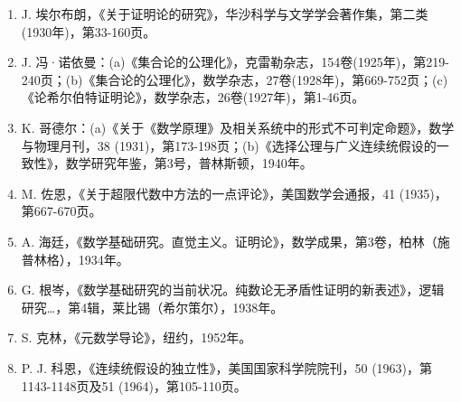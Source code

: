 \begin{enumerate}
\item
  J. 埃尔布朗，《关于证明论的研究》，华沙科学与文学学会著作集，第二类(1930年)，第33-160页。
\item
  J. 冯·诺依曼：(a)《集合论的公理化》，克雷勒杂志，154卷(1925年)，第219-240页；(b)《集合论的公理化》，数学杂志，27卷(1928年)，第669-752页；(c)《论希尔伯特证明论》，数学杂志，26卷(1927年)，第1-46页。
\item
  K. 哥德尔：(a)《关于《数学原理》及相关系统中的形式不可判定命题》，数学与物理月刊，38 (1931)，第173-198页；(b)《选择公理与广义连续统假设的一致性》，数学研究年鉴，第3号，普林斯顿，1940年。
\item
  M. 佐恩，《关于超限代数中方法的一点评论》，美国数学会通报，41 (1935)，第667-670页。
\item
  A. 海廷，《数学基础研究。直觉主义。证明论》，数学成果，第3卷，柏林（施普林格），1934年。
\item
  G. 根岑，《数学基础研究的当前状况。纯数论无矛盾性证明的新表述》，逻辑研究\ldots，第4辑，莱比锡（希尔策尔），1938年。
\item
  S. 克林，《元数学导论》，纽约，1952年。
\item
  P. J. 科恩，《连续统假设的独立性》，美国国家科学院院刊，50 (1963)，第1143-1148页及51 (1964)，第105-110页。
\end{enumerate}
